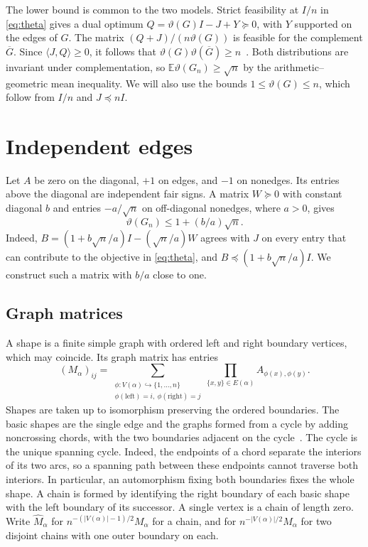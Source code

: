 \documentclass[11pt,letterpaper]{article}
\newcommand{\E}{\mathbb E}
\newcommand{\abs}[1]{\lvert #1\rvert}
\begin{document}
The lower bound is common to the two models. Strict feasibility at
\(I/n\) in \eqref{eq:theta} gives a dual optimum
\(Q=\vartheta(G)I-J+Y\succeq0\), with \(Y\) supported on the edges of
\(G\). The matrix \((Q+J)/(n\vartheta(G))\) is feasible for the complement
\(\overline G\). Since \(\langle J,Q\rangle\ge0\), it follows that
\(\vartheta(G)\vartheta(\overline G)\ge n\)~\cite{Lovasz}. Both distributions are
invariant under complementation, so \(\E\vartheta(G_n)\ge\sqrt n\) by
the arithmetic--geometric mean inequality. We will also use the bounds
\(1\le\vartheta(G)\le n\), which follow from \(I/n\) and \(J\preceq nI\).

\section{Independent edges}\label{sec:independent}

Let \(A\) be zero on the diagonal, \(+1\) on edges, and \(-1\) on
nonedges. Its entries above the diagonal are independent fair signs.
A matrix \(W\succeq0\) with constant diagonal \(b\) and entries
\(-a/\sqrt n\) on off-diagonal nonedges, where \(a>0\), gives
\begin{equation}\label{eq:witness}
 \vartheta(G_n)\le 1+(b/a)\sqrt n.
\end{equation}
Indeed, \(B=(1+b\sqrt n/a)I-(\sqrt n/a)W\) agrees with \(J\) on every
entry that can contribute to the objective in \eqref{eq:theta}, and
\(B\preceq(1+b\sqrt n/a)I\). We construct such a matrix with \(b/a\)
close to one.

\subsection{Graph matrices}

A shape is a finite simple graph with ordered left and right boundary
vertices, which may coincide. Its graph matrix has entries
\[
 (M_\alpha)_{ij}=
 \sum_{\substack{\phi:V(\alpha)\hookrightarrow\{1,\ldots,n\}\\
                 \phi(\mathrm{left})=i,\ \phi(\mathrm{right})=j}}
          \prod_{\{x,y\}\in E(\alpha)} A_{\phi(x),\phi(y)}.
\]
Shapes are taken up to isomorphism preserving the ordered boundaries.
The basic shapes are the single edge and the graphs formed from a cycle
by adding noncrossing chords, with the two boundaries adjacent on the
cycle~\cite{PX}. The cycle is the unique spanning cycle. Indeed, the
endpoints of a chord separate the interiors of its two arcs, so a
spanning path between these endpoints cannot traverse both interiors.
In particular, an automorphism fixing both boundaries fixes the whole
shape. A chain is formed by identifying the right boundary of each
basic shape with the left boundary of its successor. A single vertex
is a chain of length zero. Write \(\widehat M_\alpha\) for
\(n^{-(\abs{V(\alpha)}-1)/2}M_\alpha\) for a chain, and for
\(n^{-\abs{V(\alpha)}/2}M_\alpha\) for two disjoint chains with one
outer boundary on each.
\end{document}
